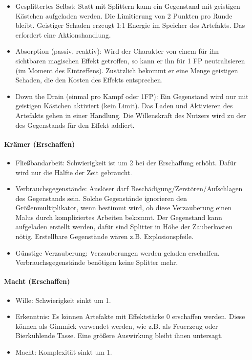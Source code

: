 \documentclass{article}
\begin{document}
\begin{itemize}
\item Gesplittertes Selbst: Statt mit Splittern kann ein Gegenstand mit geistigen Kästchen aufgeladen werden. Die Limitierung von 2 Punkten pro Runde bleibt. Geistiger Schaden erzeugt 1:1 Energie im Speicher des Artefakts. Das erfordert eine Aktionshandlung.
\item Absorption (passiv, reaktiv): Wird der Charakter von einem für ihn sichtbaren magischen Effekt getroffen, so kann er ihn für 1 FP neutralisieren (im Moment des Eintreffens). Zusätzlich bekommt er eine Menge geistigen Schaden, die den Kosten des Effekts entsprechen.
\item Down the Drain (einmal pro Kampf oder 1FP): Ein Gegenstand wird nur mit geistigen Kästchen aktiviert (kein Limit). Das Laden und Aktivieren des Artefakts gehen in einer Handlung. Die Willenskraft des Nutzers wird zu der des Gegenstands für den Effekt addiert.
\end{itemize}

\paragraph{Krämer (Erschaffen)}

\begin{itemize}
\item Fließbandarbeit: Schwierigkeit ist um 2 bei der Erschaffung erhöht. Dafür wird nur die Hälfte der Zeit gebraucht.
\item Verbrauchsgegenstände: Auslöser darf Beschädigung/Zerstören/Aufschlagen des Gegenstands sein. Solche Gegenstände ignorieren den Größenmultiplikator, wenn bestimmt wird, ob diese Verzauberung einen Malus durch kompliziertes Arbeiten bekommt. Der Gegenstand kann aufgeladen erstellt werden, dafür sind Splitter in Höhe der Zauberkosten nötig. Erstellbare Gegenstände wären z.B. Explosionspfeile.
\item Günstige Verzauberung: Verzauberungen werden geladen erschaffen. Verbrauchsgegenstände benötigen keine Splitter mehr.
\end{itemize}

\paragraph{Macht (Erschaffen)}

\begin{itemize}
\item Wille: Schwierigkeit sinkt um 1.
\item Erkenntnis: Es können Artefakte mit Effektstärke 0 erschaffen werden. Diese können als Gimmick verwendet werden, wie z.B. als Feuerzeug oder Bierkühlende Tasse. Eine größere Auswirkung bleibt ihnen untersagt.
\item Macht: Komplexität sinkt um 1.
\end{itemize}
\end{document}
